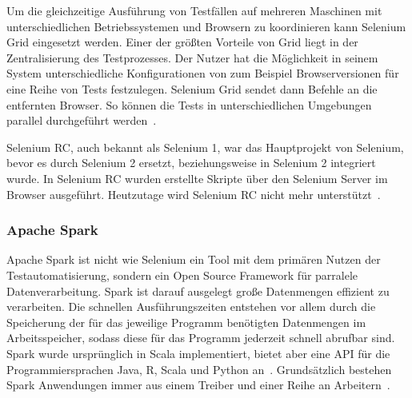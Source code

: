 Um die gleichzeitige Ausführung von Testfällen auf mehreren Maschinen mit unterschiedlichen Betriebssystemen und Browsern zu koordinieren kann Selenium Grid eingesetzt werden. Einer der größten Vorteile von Grid liegt in der Zentralisierung des Testprozesses. Der Nutzer hat die Möglichkeit in seinem System unterschiedliche Konfigurationen von zum Beispiel Browserversionen für eine Reihe von Tests festzulegen. Selenium Grid sendet dann Befehle an die entfernten Browser. So können die Tests in unterschiedlichen Umgebungen parallel durchgeführt werden~\cite{selenium.grid}.
\newline

Selenium \ac{RC}, auch bekannt als Selenium 1, war das Hauptprojekt von Selenium, bevor es durch Selenium 2 ersetzt, beziehungsweise in Selenium 2 integriert wurde. In Selenium \ac{RC} wurden erstellte Skripte über den Selenium Server im Browser ausgeführt. Heutzutage wird Selenium RC nicht mehr unterstützt~\cite{selenium.rc}.


\subsubsection{Apache Spark}
Apache Spark ist nicht wie Selenium ein Tool mit dem primären Nutzen der Testautomatisierung, sondern ein Open Source Framework für parralele Datenverarbeitung. Spark ist darauf ausgelegt große Datenmengen effizient zu verarbeiten. Die schnellen Ausführungszeiten entstehen vor allem durch die Speicherung der für das jeweilige Programm benötigten Datenmengen im Arbeitsspeicher, sodass diese für das Programm jederzeit schnell abrufbar sind. Spark wurde ursprünglich in Scala implementiert, bietet aber eine \ac{API} für die Programmiersprachen Java, R, Scala und Python an~\cite{Bengfort.2016}.
Grundsätzlich bestehen Spark Anwendungen immer aus einem Treiber und einer Reihe an Arbeitern~\cite{Chellappan.2018}.
\newline

